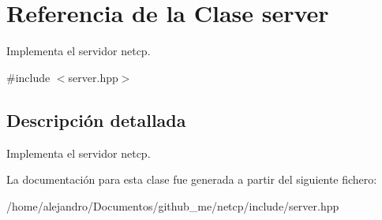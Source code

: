\hypertarget{classserver}{}\section{Referencia de la Clase server}
\label{classserver}


Implementa el servidor netcp.  




{\ttfamily \#include $<$server.\+hpp$>$}



\subsection{Descripción detallada}
Implementa el servidor netcp. 

La documentación para esta clase fue generada a partir del siguiente fichero\+:\begin{DoxyCompactItemize}
\item 
/home/alejandro/\+Documentos/github\+\_\+me/netcp/include/server.\+hpp\end{DoxyCompactItemize}
